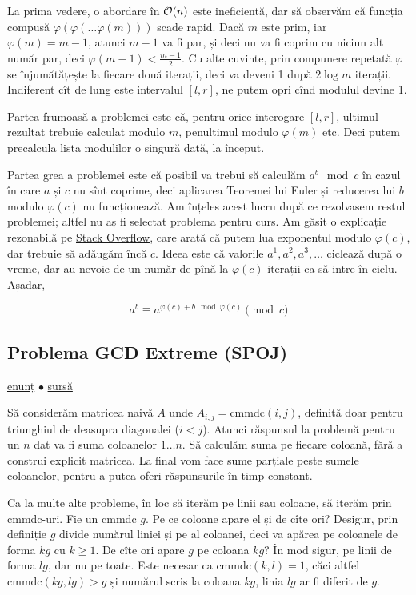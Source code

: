 \documentclass[../main.tex]{subfiles}
\begin{document}
La prima vedere, o abordare în $\mathcal{O}(n)$ este ineficientă, dar să observăm că funcția compusă $\varphi(\varphi(\dots\varphi(m)))$ scade rapid. Dacă $m$ este prim, iar $\varphi(m) = m-1$, atunci $m-1$ va fi par, și deci nu va fi coprim cu niciun alt număr par, deci $\varphi(m - 1) < \frac{m-1}{2}$. Cu alte cuvinte, prin compunere repetată $\varphi$ se înjumătățește la fiecare două iterații, deci va deveni 1 după $2 \log m$ iterații. Indiferent cît de lung este intervalul $[l,r]$, ne putem opri cînd modulul devine 1.

Partea frumoasă a problemei este că, pentru orice interogare $[l,r]$, ultimul rezultat trebuie calculat modulo $m$, penultimul modulo $\varphi(m)$ etc. Deci putem precalcula lista modulilor o singură dată, la început.

Partea grea a problemei este că posibil va trebui să calculăm $a^b \mod c$ în cazul în care $a$ și $c$ nu sînt coprime, deci aplicarea Teoremei lui Euler și reducerea lui $b$ modulo $\varphi(c)$ nu funcționează. Am înțeles acest lucru după ce rezolvasem restul problemei; altfel nu aș fi selectat problema pentru curs.  Am găsit o explicație rezonabilă pe \href{https://stackoverflow.com/a/21368784/6022817}{Stack Overflow}, care arată că putem lua exponentul modulo $\varphi(c)$, dar trebuie să adăugăm încă $c$. Ideea este că valorile $a^1, a^2, a^3, \dots$ ciclează după o vreme, dar au nevoie de un număr de pînă la $\varphi(c)$ iterații ca să intre în ciclu. Așadar,

$$a^b \equiv a^{\varphi(c) + b \mod \varphi(c)} \pmod c$$


\subsection{Problema GCD Extreme (SPOJ)}
\label{problem:gcd-extreme}

\href{https://www.spoj.com/problems/GCDEX/}{enunț}
$\bullet$
\hyperref[code:gcd-extreme]{sursă}

Să considerăm matricea naivă $A$ unde $A_{i,j} = \text{cmmdc}(i,j)$, definită doar pentru triunghiul de deasupra diagonalei ($i < j$). Atunci răspunsul la problemă pentru un $n$ dat va fi suma coloanelor $1 \dots n$. Să calculăm suma pe fiecare coloană, fără a construi explicit matricea. La final vom face sume parțiale peste sumele coloanelor, pentru a putea oferi răspunsurile în timp constant.

Ca la multe alte probleme, în loc să iterăm pe linii sau coloane, să iterăm prin cmmdc-uri. Fie un cmmdc $g$. Pe ce coloane apare el și de cîte ori? Desigur, prin definiție $g$ divide numărul liniei și pe al coloanei, deci va apărea pe coloanele de forma $kg$ cu $k \geq 1$. De cîte ori apare $g$ pe coloana $kg$? În mod sigur, pe linii de forma $lg$, dar nu pe toate. Este necesar ca $\text{cmmdc}(k,l) = 1$, căci altfel $\text{cmmdc}(kg, lg) > g$ și numărul scris la coloana $kg$, linia $lg$ ar fi diferit de $g$.
\end{document}
